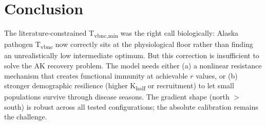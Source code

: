\documentclass[11pt]{article}
\begin{document}
\section{Conclusion}

The literature-constrained T\textsubscript{vbnc,min} was the right call biologically: Alaska pathogen T\textsubscript{vbnc} now correctly sits at the physiological floor rather than finding an unrealistically low intermediate optimum. But this correction is insufficient to solve the AK recovery problem. The model needs either (a) a nonlinear resistance mechanism that creates functional immunity at achievable $r$ values, or (b) stronger demographic resilience (higher K\textsubscript{half} or recruitment) to let small populations survive through disease seasons. The gradient shape (north $>$ south) is robust across all tested configurations; the absolute calibration remains the challenge.
\end{document}
